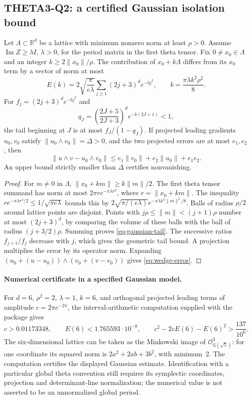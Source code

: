 \documentclass[11pt]{article}
\newcommand{\Q}{\mathbb Q}\newcommand{\C}{\mathbb C}\newcommand{\Z}{\mathbb Z}\newcommand{\R}{\mathbb R}\newcommand{\A}{\mathbb A}\newcommand{\OO}{\mathcal O}
\theoremstyle{definition}\newtheorem{definition}[theorem]{Definition}\newtheorem{remark}[theorem]{Remark}
\begin{document}
\subsection{THETA3-Q2: a certified Gaussian isolation bound}\label{Q2}
Let $\Lambda\subset\R^d$ be a lattice with minimum nonzero norm at least $\rho>0$. Assume $\operatorname{Im}Z\geq\lambda I$, $\lambda>0$, for the period matrix in the first theta tensor. Fix $0\ne x_0\in\Lambda$ and an integer $k\geq2\|x_0\|/\rho$. The contribution of $x_0+k\Lambda$ differs from its $x_0$ term by a vector of norm at most
\begin{equation}\label{eq:gaussian-tail}
 E(k)=2\sqrt{\frac{\pi}{e\lambda}}
 \sum_{j\geq1}(2j+3)^d e^{-b j^2},
 \qquad b=\frac{\pi\lambda k^2\rho^2}{8}.
\end{equation}
For $f_j=(2j+3)^d e^{-bj^2}$ and
\[
 q_J=\left(\frac{2J+5}{2J+3}\right)^d e^{-b(2J+1)}<1,
\]
the tail beginning at $J$ is at most $f_J/(1-q_J)$.
If projected leading gradients $u_0,v_0$ satisfy
$\|u_0\wedge v_0\|=\Delta>0$, and the two projected errors are at most $e_1,e_2$, then
\begin{equation}\label{eq:wedge-error}
 \|u\wedge v-u_0\wedge v_0\|
 \leq e_1\|v_0\|+e_2\|u_0\|+e_1e_2.
\end{equation}
An upper bound strictly smaller than $\Delta$ certifies nonvanishing.
\begin{proof}
For $m\ne0$ in $\Lambda$, $\|x_0+km\|\geq k\|m\|/2$.
The first theta tensor summand has norm at most $2\pi r e^{-\pi\lambda r^2}$, where $r=\|x_0+km\|$. The inequality
$r e^{-\pi\lambda r^2/2}\leq1/\sqrt{\pi e\lambda}$ bounds this by
$2\sqrt{\pi/(e\lambda)}e^{-\pi\lambda k^2\|m\|^2/8}$.
Balls of radius $\rho/2$ around lattice points are disjoint. Points with
$j\rho\leq\|m\|<(j+1)\rho$ number at most $(2j+3)^d$, by comparing the volume of these balls with the ball of radius $(j+3/2)\rho$. Summing proves \eqref{eq:gaussian-tail}. The successive ratios $f_{j+1}/f_j$ decrease with $j$, which gives the geometric tail bound. A projection multiplies the error by its operator norm. Expanding
$(u_0+(u-u_0))\wedge(v_0+(v-v_0))$ gives \eqref{eq:wedge-error}.
\end{proof}
\paragraph{Numerical certificate in a specified Gaussian model.}
For $d=6$, $\rho^2=2$, $\lambda=1$, $k=6$, and orthogonal projected leading terms of amplitude $c=2\pi e^{-2\pi}$, the interval-arithmetic computation supplied with the package gives
\[
 c>0.01173348,\qquad E(6)<1.765593\cdot10^{-8},
 \qquad c^2-2cE(6)-E(6)^2>\frac{137}{10^6}.
\]
The six-dimensional lattice can be taken as the Minkowski image of
$\OO_{\Q(\sqrt5)}^3$: for one coordinate its squared norm is
$2a^2+2ab+3b^2$, with minimum~2. The computation certifies the displayed Gaussian estimate. Identification with a particular global theta convention still requires its symplectic coordinates, projection and determinant-line normalization; the numerical value is not asserted to be an unnormalized global period.
\end{document}
